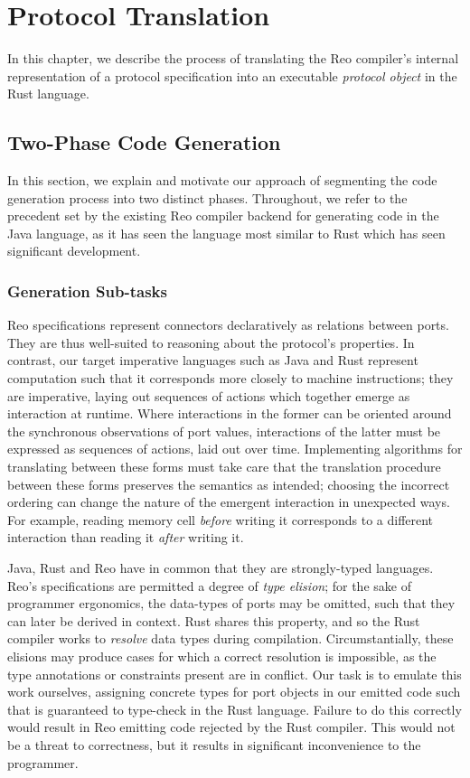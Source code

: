 \chapter{Protocol Translation}
\label{sec:imperative_form}
In this chapter, we describe the process of translating the Reo compiler's internal representation of a protocol specification into an executable \textit{protocol object} in the Rust language.

\section{Two-Phase Code Generation}
In this section, we explain and motivate our approach of segmenting the code generation process into two distinct phases. Throughout, we refer to the precedent set by the existing Reo compiler backend for generating code in the Java language, as it has seen the language most similar to Rust which has seen significant development.   

\subsection{Generation Sub-tasks}
\label{sec:sub_tasks}
Reo specifications represent connectors declaratively as relations between ports. They are thus well-suited to reasoning about the protocol's properties. In contrast, our target imperative languages such as Java and Rust represent computation such that it corresponds more closely to machine instructions; they are imperative, laying out sequences of actions which together emerge as interaction at runtime. Where interactions in the former can be oriented around the synchronous observations of port values, interactions of the latter must be expressed as sequences of actions, laid out over time. Implementing algorithms for translating between these forms must take care that the translation procedure between these forms preserves the semantics as intended; choosing the incorrect ordering can change the nature of the emergent interaction in unexpected ways. For example, reading memory cell \textit{before} writing it corresponds to a different interaction than reading it \textit{after} writing it. 

Java, Rust and Reo have in common that they are strongly-typed languages. Reo's specifications are permitted a degree of \textit{type elision}; for the sake of programmer ergonomics, the data-types of ports may be omitted, such that they can later be derived in context. Rust shares this property, and so the Rust compiler works to \textit{resolve} data types during compilation. Circumstantially, these elisions may produce cases for which a correct resolution is impossible, as the type annotations or constraints present are in conflict. Our task is to emulate this work ourselves, assigning concrete types for port objects in our emitted code such that is guaranteed to type-check in the Rust language. Failure to do this correctly would result in Reo emitting code rejected by the Rust compiler. This would not be a threat to correctness, but it results in significant inconvenience to the programmer.

